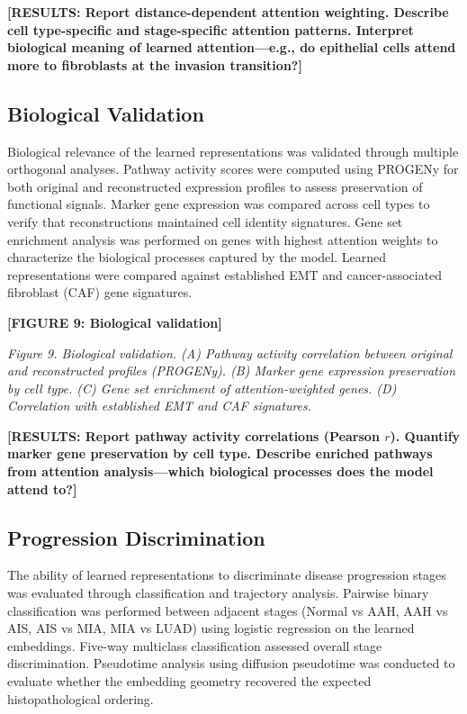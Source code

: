 \textbf{[RESULTS: Report distance-dependent attention weighting. Describe cell type-specific and stage-specific attention patterns. Interpret biological meaning of learned attention---e.g., do epithelial cells attend more to fibroblasts at the invasion transition?]}


\subsection{Biological Validation}

Biological relevance of the learned representations was validated through multiple orthogonal analyses. Pathway activity scores were computed using PROGENy for both original and reconstructed expression profiles to assess preservation of functional signals. Marker gene expression was compared across cell types to verify that reconstructions maintained cell identity signatures. Gene set enrichment analysis was performed on genes with highest attention weights to characterize the biological processes captured by the model. Learned representations were compared against established EMT and cancer-associated fibroblast (CAF) gene signatures.

\textbf{[FIGURE 9: Biological validation]}

\textit{Figure 9. Biological validation. (A) Pathway activity correlation between original and reconstructed profiles (PROGENy). (B) Marker gene expression preservation by cell type. (C) Gene set enrichment of attention-weighted genes. (D) Correlation with established EMT and CAF signatures.}

\textbf{[RESULTS: Report pathway activity correlations (Pearson $r$). Quantify marker gene preservation by cell type. Describe enriched pathways from attention analysis---which biological processes does the model attend to?]}


\subsection{Progression Discrimination}

The ability of learned representations to discriminate disease progression stages was evaluated through classification and trajectory analysis. Pairwise binary classification was performed between adjacent stages (Normal vs AAH, AAH vs AIS, AIS vs MIA, MIA vs LUAD) using logistic regression on the learned embeddings. Five-way multiclass classification assessed overall stage discrimination. Pseudotime analysis using diffusion pseudotime was conducted to evaluate whether the embedding geometry recovered the expected histopathological ordering.

